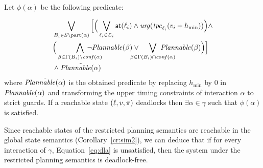 \begin{theorem}\label{thm:dla}
  Let $\phi(\alpha)$ be the following predicate:

    \begin{equation}\label{eq:dla}
  \begin{split}
    &\bigvee_{B_i\in S\setminus\p{\alpha}}\Big[\Big(
    \bigvee_{\loc_i\in\Loc_i}\at{\loc_i}
  \wedge\urg(\tpc{\loc_i}(\val_i+h_{\min}))\Big)\wedge\\
  &\Big(\bigwedge_{\beta\in\Gamma(B_i)\setminus\confl(\alpha)}\hspace{-8mm}
    \neg\plntxt{\beta}\vee\hspace{-5mm}\bigvee_{\beta\in\Gamma(B_i)\cap\confl(\alpha)}
\hspace{-8mm}\plntxt{\beta}\Big)\Big]\\
&\wedge\tilde{\plntxt{\alpha}} 
  \end{split}
\end{equation}
  where $\tilde{\mathit{Plannable(\alpha)}}$ is the obtained predicate by replacing 
  $h_{\min}$ by 0 in $\mathit{Plannable(\alpha)}$ and transforming the upper 
  timing constraints of interaction $\alpha$ to strict guards.
  If a reachable state $(\ell,v,\pi)$ deadlocks then $\exists\alpha\in\gamma$ 
  such that $\phi(\alpha)$ is satisfied.
\end{theorem}

Since reachable states of the restricted planning semantics are reachable 
in the global state semantics (Corollary~\ref{cr:sim2}), we can deduce that if for
every interaction of $\gamma$, Equation~\ref{eq:dla} is unsatisfied, then the system
under the restricted planning semantics is deadlock-free.


